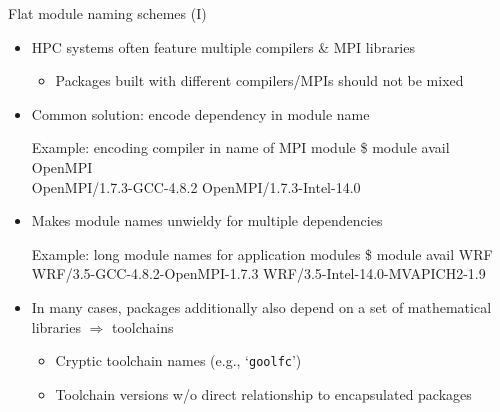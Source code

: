 \documentclass[10pt,xcolor={usenames,dvipsnames}]{beamer}
\begin{document}

\begin{frame}{Flat module naming schemes (I)}
\begin{itemize}
    \item
        HPC systems often feature multiple compilers \& MPI libraries
        \begin{itemize}
            \item
                Packages built with different compilers/MPIs should not
                be mixed
        \end{itemize}
    \item
        Common solution: encode dependency in module name\\
        \enskip
        \begin{minipage}{0.9\textwidth}
            \begin{exampleblock}{Example: encoding compiler in name of MPI module}
                \ttfamily
                \$ module avail OpenMPI\\
                OpenMPI/1.7.3-GCC-4.8.2
                    \quad OpenMPI/1.7.3-Intel-14.0
            \end{exampleblock}
        \end{minipage}
    \smallskip
    \item
        Makes module names unwieldy for multiple dependencies\\
        \enskip
        \begin{minipage}{0.9\textwidth}
            \begin{exampleblock}{Example: long module names for application modules}
                \ttfamily
                \$ module avail WRF\\
                WRF/3.5-GCC-4.8.2-OpenMPI-1.7.3
                    \quad WRF/3.5-Intel-14.0-MVAPICH2-1.9
            \end{exampleblock}
        \end{minipage}
    \smallskip
    \item
        In many cases, packages additionally also depend on a set of
        mathematical libraries $\Rightarrow$ toolchains
        \begin{itemize}
            \item
                Cryptic toolchain names (e.g., `\texttt{goolfc}')
            \item
                Toolchain versions w/o direct relationship to encapsulated packages
        \end{itemize}
\end{itemize}
\end{frame}
\end{document}
